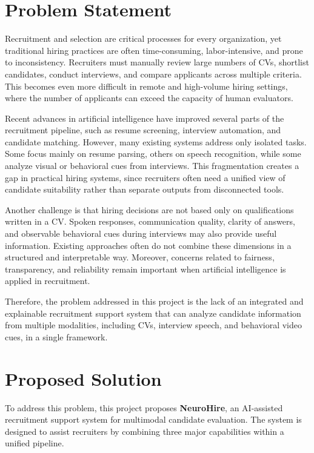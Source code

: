 \section{Problem Statement}
Recruitment and selection are critical processes for every organization, yet traditional hiring practices are often time-consuming, labor-intensive, and prone to inconsistency. Recruiters must manually review large numbers of CVs, shortlist candidates, conduct interviews, and compare applicants across multiple criteria. This becomes even more difficult in remote and high-volume hiring settings, where the number of applicants can exceed the capacity of human evaluators.

Recent advances in artificial intelligence have improved several parts of the recruitment pipeline, such as resume screening, interview automation, and candidate matching. However, many existing systems address only isolated tasks. Some focus mainly on resume parsing, others on speech recognition, while some analyze visual or behavioral cues from interviews. This fragmentation creates a gap in practical hiring systems, since recruiters often need a unified view of candidate suitability rather than separate outputs from disconnected tools.

Another challenge is that hiring decisions are not based only on qualifications written in a CV. Spoken responses, communication quality, clarity of answers, and observable behavioral cues during interviews may also provide useful information. Existing approaches often do not combine these dimensions in a structured and interpretable way. Moreover, concerns related to fairness, transparency, and reliability remain important when artificial intelligence is applied in recruitment.

Therefore, the problem addressed in this project is the lack of an integrated and explainable recruitment support system that can analyze candidate information from multiple modalities, including CVs, interview speech, and behavioral video cues, in a single framework.

\section{Proposed Solution}
To address this problem, this project proposes \textbf{NeuroHire}, an AI-assisted recruitment support system for multimodal candidate evaluation. The system is designed to assist recruiters by combining three major capabilities within a unified pipeline.

